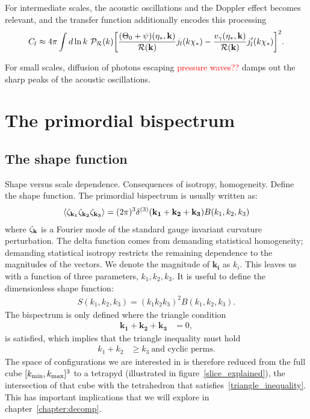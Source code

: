     For intermediate scales, the acoustic oscillations and the Doppler effect
    becomes relevant, and the transfer function additionally encodes this processing
    \begin{align}
        C_l \approx 4\pi\int d\ln k~\mathcal{P}_{\mathcal{R}}(k){\left[
            \frac{(\Theta_0+\psi)(\eta_*,\mathbf{k})}{\mathcal{R}(\mathbf{k})}j_l(k\chi_*)
            -\frac{v_\gamma(\eta_*,\mathbf{k})}{\mathcal{R}(\mathbf{k})}j'_l(k\chi_*)
            \right]}^2.
    \end{align}


    For small scales, diffusion of photons escaping \textcolor{red}{pressure waves??}
    damps out the sharp peaks of the acoustic oscillations.


\section{The primordial bispectrum}
    \subsection{The shape function}
    Shape versus scale dependence.
    Consequences of isotropy, homogeneity.
    Define the shape function.
The primordial bispectrum is usually written as:
\begin{align}
{
\left< \zeta_{\bf{k_1}}\zeta_{\bf{k_2}}\zeta_{\bf{k_3}} \right>
= (2\pi)^3\delta^{(3)}(\mathbf{k_1}+\mathbf{k_2}+\mathbf{k_3})B(k_1,k_2,k_3)
}
\end{align}
where $\zeta_{\bf{k}}$ is a Fourier mode of the standard gauge invariant curvature perturbation.
The delta function comes from demanding statistical homogeneity;
demanding statistical isotropy restricts the remaining dependence to the magnitudes of the vectors.
We denote the magnitude of $\mathbf{k_i}$ as $k_i$.
This leaves us with a function of three parameters,
$k_1,k_2,k_3$.
It is useful to define the dimensionless shape function:
\begin{align}\label{shapefn}
{
    S(k_1,k_2,k_3) = (k_1k_2k_3)^2B(k_1,k_2,k_3).
}
\end{align}
The bispectrum is only defined where the triangle condition
\begin{align}\label{triangle_condition}
    \mathbf{k_1}+\mathbf{k_2}+\mathbf{k_3} &= 0,
\end{align}
is satisfied, which implies that the triangle inequality must hold
\begin{align}\label{triangle_inequality}
    k_1+k_2 &\geq k_3~\text{and cyclic perms}.
\end{align}
The space of configurations we are interested in is therefore
reduced from the full cube $[{k_\text{min}},{k_\text{max}}]^3$
to a tetrapyd (illustrated in figure~\ref{slice_explained}),
the intersection of that cube with the
tetrahedron that satisfies~\eqref{triangle_inequality}.
This has important implications that we will explore in
chapter~\ref{chapter:decomp}. 


